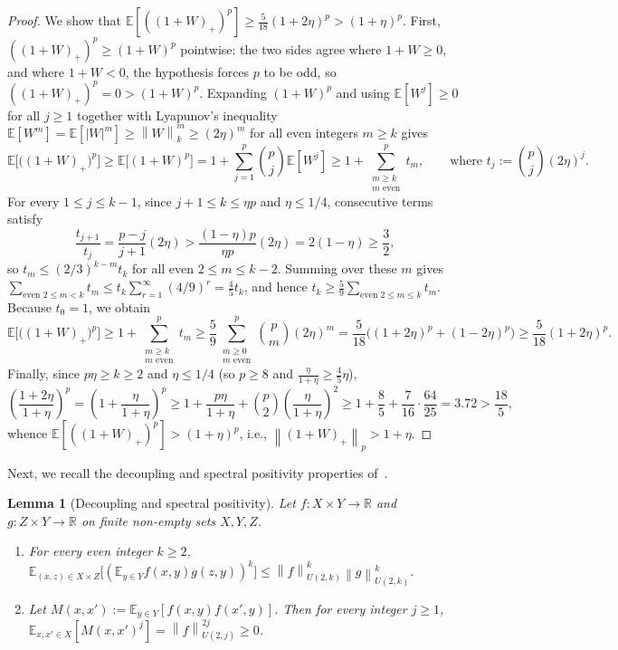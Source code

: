 \documentclass[11pt]{article}
\newtheorem{lemma}[theorem]{Lemma}
\theoremstyle{definition}
\renewcommand{\label}[1]{}%
\newcommand{\E}{\mathbb{E}}
\newcommand{\R}{\mathbb{R}}
\newcommand{\norm}[1]{\left\lVert #1 \right\rVert}
\newcommand{\abs}[1]{\left\lvert #1 \right\rvert}
\begin{document}
\begin{proof}
We show that $\E[((1 + W)_+)^p] \ge \frac{5}{18}(1 + 2\eta)^p > (1 + \eta)^p$. First, $((1 + W)_+)^p \ge (1 + W)^p$ pointwise: the two sides agree where $1 + W \ge 0$, and where $1 + W < 0$, the hypothesis forces $p$ to be odd, so $((1 + W)_+)^p = 0 > (1 + W)^p$. Expanding $(1 + W)^p$ and using $\E[W^j] \ge 0$ for all $j \ge 1$ together with Lyapunov's inequality $\E[W^m] = \E[\abs{W}^m] \ge \norm{W}_k^m \ge (2\eta)^m$ for all even integers $m \ge k$ gives
\[
    \E\Big[\big((1 + W)_+\big)^p\Big] \ge \E\big[(1 + W)^p\big] = 1 + \sum_{j=1}^p \binom{p}{j}\E[W^j] \ge 1 + \sum_{\substack{m \ge k \\ m \text{ even}}}^p t_m, \qquad \text{where } t_j := \binom{p}{j}(2\eta)^j.
\]
For every $1 \le j \le k-1$, since $j+1 \le k \le \eta p$ and $\eta \le 1/4$, consecutive terms satisfy
\[
    \frac{t_{j+1}}{t_j} = \frac{p - j}{j + 1}(2\eta) > \frac{(1 - \eta)p}{\eta p}(2\eta) = 2(1 - \eta) \ge \frac{3}{2},
\]
so $t_m \le (2/3)^{k-m} t_k$ for all even $2 \le m \le k-2$. Summing over these $m$ gives $\sum_{\text{even } 2 \le m < k} t_m \le t_k \sum_{r=1}^{\infty} (4/9)^r = \frac{4}{5}t_k$, and hence $t_k \ge \frac{5}{9}\sum_{\text{even } 2 \le m \le k} t_m$. Because $t_0 = 1$, we obtain
\[
    \E\Big[\big((1 + W)_+\big)^p\Big] \ge 1 + \sum_{\substack{m \ge k \\ m \text{ even}}}^p t_m \ge \frac{5}{9}\sum_{\substack{m \ge 0 \\ m \text{ even}}}^p \binom{p}{m}(2\eta)^m = \frac{5}{18}\Big((1 + 2\eta)^p + (1 - 2\eta)^p\Big) \ge \frac{5}{18}(1 + 2\eta)^p.
\]
Finally, since $p\eta \ge k \ge 2$ and $\eta \le 1/4$ (so $p \ge 8$ and $\frac{\eta}{1+\eta} \ge \frac{4}{5}\eta$),
\[
    \left(\frac{1 + 2\eta}{1 + \eta}\right)^p = \left(1 + \frac{\eta}{1 + \eta}\right)^p \ge 1 + \frac{p\eta}{1 + \eta} + \binom{p}{2}\left(\frac{\eta}{1 + \eta}\right)^2 \ge 1 + \frac{8}{5} + \frac{7}{16}\cdot\frac{64}{25} = 3.72 > \frac{18}{5},
\]
whence $\E[((1 + W)_+)^p] > (1 + \eta)^p$, i.e., $\norm{(1 + W)_+}_p > 1 + \eta$.
\end{proof}

Next, we recall the decoupling and spectral positivity properties of~\cite[Lemma~4.3 \& Claim~4.4]{KelleyLM23}.

\begin{lemma}[Decoupling and spectral positivity]
\label{lem:decoupling-psd}
Let $f : X \times Y \to \R$ and $g : Z \times Y \to \R$ on finite non-empty sets $X, Y, Z$.
\begin{enumerate}[leftmargin=*]
    \item For every even integer $k \ge 2$, $\E_{(x, z) \in X \times Z}\big[(\E_{y \in Y} f(x, y) g(z, y))^k\big] \le \norm{f}_{U(2, k)}^k \norm{g}_{U(2, k)}^k$.
    \item Let $M(x, x') := \E_{y \in Y}[f(x, y) f(x', y)]$. Then for every integer $j \ge 1$, $\E_{x, x' \in X}[M(x, x')^j] = \norm{f}_{U(2, j)}^{2j} \ge 0$.
\end{enumerate}
\end{lemma}
\end{document}
